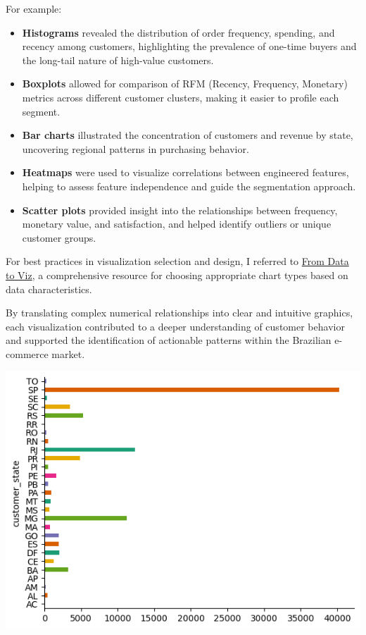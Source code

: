 \documentclass[a4paper]{article}
\begin{document}
\begin{multicols}{2}
For example:
\begin{itemize}
    \item \textbf{Histograms} revealed the distribution of order frequency, spending, and recency among customers, highlighting the prevalence of one-time buyers and the long-tail nature of high-value customers.
    \item \textbf{Boxplots} allowed for comparison of RFM (Recency, Frequency, Monetary) metrics across different customer clusters, making it easier to profile each segment.
    \item \textbf{Bar charts} illustrated the concentration of customers and revenue by state, uncovering regional patterns in purchasing behavior.
    \item \textbf{Heatmaps} were used to visualize correlations between engineered features, helping to assess feature independence and guide the segmentation approach.
    \item \textbf{Scatter plots} provided insight into the relationships between frequency, monetary value, and satisfaction, and helped identify outliers or unique customer groups.
\end{itemize}

For best practices in visualization selection and design, I referred to \href{https://www.data-to-viz.com/}{From Data to Viz}, a comprehensive resource for choosing appropriate chart types based on data characteristics.

By translating complex numerical relationships into clear and intuitive graphics, each visualization contributed to a deeper understanding of customer behavior and supported the identification of actionable patterns within the Brazilian e-commerce market.

\noindent
\begin{minipage}{\columnwidth}
\centering
\includegraphics[width=1\textwidth]{customer_state.png}
\label{fig:Customer Distribution by State} 
\end{minipage}


\end{multicols}
\end{document}
